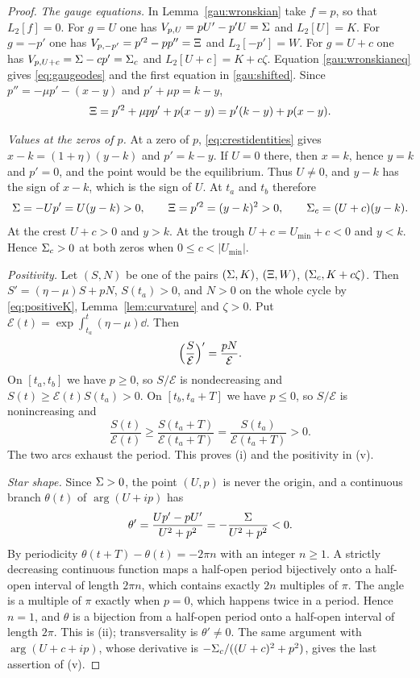 \begin{proof}
\emph{The gauge equations.} In Lemma~\ref{gau:wronskian} take $f=p$, so that $L_2[f]=0$. For $g=U$ one has $V_{p,U}=pU'-p'U=\Sigma$ and $L_2[U]=K$. For $g=-p'$ one has $V_{p,-p'}=p'^2-pp''=\Xi$ and $L_2[-p']=W$. For $g=U+c$ one has $V_{p,U+c}=\Sigma-cp'=\Sigma_c$ and $L_2[U+c]=K+c\zeta$. Equation \eqref{gau:wronskianeq} gives \eqref{eq:gaugeodes} and the first equation in \eqref{gau:shifted}. Since $p''=-\mu p'-(x-y)$ and $p'+\mu p=k-y$,
\[
\Xi=p'^2+\mu pp'+p(x-y)=p'(k-y)+p(x-y).
\]

\emph{Values at the zeros of $p$.} At a zero of $p$, \eqref{eq:crestidentities} gives $x-k=(1+\eta)(y-k)$ and $p'=k-y$. If $U=0$ there, then $x=k$, hence $y=k$ and $p'=0$, and the point would be the equilibrium. Thus $U\ne0$, and $y-k$ has the sign of $x-k$, which is the sign of $U$. At $t_a$ and $t_b$ therefore
\[
\Sigma=-Up'=U(y-k)>0,\qquad \Xi=p'^2=(y-k)^2>0,\qquad \Sigma_c=(U+c)(y-k).
\]
At the crest $U+c>0$ and $y>k$. At the trough $U+c=U_{\min}+c<0$ and $y<k$. Hence $\Sigma_c>0$ at both zeros when $0\le c<|U_{\min}|$.

\emph{Positivity.} Let $(S,N)$ be one of the pairs $(\Sigma,K)$, $(\Xi,W)$, $(\Sigma_c,K+c\zeta)$. Then $S'=(\eta-\mu)S+pN$, $S(t_a)>0$, and $N>0$ on the whole cycle by \eqref{eq:positiveK}, Lemma~\ref{lem:curvature} and $\zeta>0$. Put $\mathcal E(t)=\exp\int_{t_a}^t(\eta-\mu)\dd$. Then
\[
\Bigl(\frac{S}{\mathcal E}\Bigr)'=\frac{pN}{\mathcal E}.
\]
On $[t_a,t_b]$ we have $p\ge0$, so $S/\mathcal E$ is nondecreasing and $S(t)\ge\mathcal E(t)S(t_a)>0$. On $[t_b,t_a+T]$ we have $p\le0$, so $S/\mathcal E$ is nonincreasing and
\[
\frac{S(t)}{\mathcal E(t)}\ge\frac{S(t_a+T)}{\mathcal E(t_a+T)}=\frac{S(t_a)}{\mathcal E(t_a+T)}>0 .
\]
The two arcs exhaust the period. This proves (i) and the positivity in (v).

\emph{Star shape.} Since $\Sigma>0$, the point $(U,p)$ is never the origin, and a continuous branch $\theta(t)$ of $\arg(U+ip)$ has
\[
\theta'=\frac{Up'-pU'}{U^2+p^2}=-\frac{\Sigma}{U^2+p^2}<0 .
\]
By periodicity $\theta(t+T)-\theta(t)=-2\pi n$ with an integer $n\ge1$. A strictly decreasing continuous function maps a half-open period bijectively onto a half-open interval of length $2\pi n$, which contains exactly $2n$ multiples of $\pi$. The angle is a multiple of $\pi$ exactly when $p=0$, which happens twice in a period. Hence $n=1$, and $\theta$ is a bijection from a half-open period onto a half-open interval of length $2\pi$. This is (ii); transversality is $\theta'\ne0$. The same argument with $\arg(U+c+ip)$, whose derivative is $-\Sigma_c/((U+c)^2+p^2)$, gives the last assertion of (v).


\end{proof}
